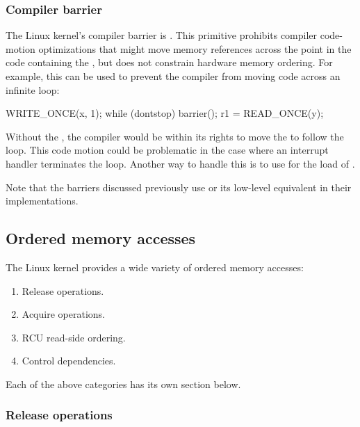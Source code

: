 \subsubsection{Compiler barrier}

The Linux kernel's compiler barrier is .
This primitive prohibits compiler code-motion optimizations that might
move memory references across the point in the code containing the
, but does not constrain hardware memory ordering.
For example, this can be used to prevent the compiler from moving code
across an infinite loop:

\begin{VerbatimU}
	WRITE_ONCE(x, 1);
	while (dontstop)
		barrier();
	r1 = READ_ONCE(y);
\end{VerbatimU}

Without the , the compiler would be within its rights to move the
 to follow the loop.
This code motion could be problematic in the case where an interrupt
handler terminates the loop.
Another way to handle this is to use  for the load of
.

Note that the barriers discussed previously use  or its low-level
equivalent in their implementations.


\subsection{Ordered memory accesses}
\label{sec:docs:ordering:Ordered memory accesses}

The Linux kernel provides a wide variety of ordered memory accesses:

\begin{enumerate}
 \item	Release operations.

 \item	Acquire operations.

 \item	RCU read-side ordering.

 \item	Control dependencies.
\end{enumerate}

Each of the above categories has its own section below.


\subsubsection{Release operations}
\label{sec:docs:ordering:Release operations}

